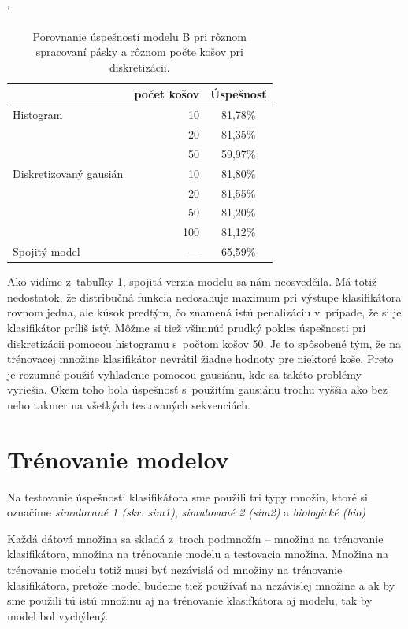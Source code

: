 \begin{table}[h]
\catcode`
\centering
\begin{tabular}{lrc}
\toprule
& počet košov & Úspešnosť\\
\midrule
Histogram & 10 & 81,78\%\\
 & 20 & 81,35\%\\
 & 50 & 59,97\%\\
Diskretizovaný gausián & 10 & 81,80\%\\
 & 20 & 81,55\%\\
 & 50 & 81,20\%\\
 & 100 & 81,12\%\\
Spojitý model & --- & 65,59\%\\
\bottomrule
\end{tabular}
\vspace{0.5cm}
\caption[Porovnanie úspešností pri rôznom spracovaní pásky]{Porovnanie úspešností modelu B pri rôznom spracovaní pásky a rôznom počte košov pri diskretizácii.}
\label{tab:success-b-tape}
\end{table}

Ako vidíme z~tabuľky \ref{tab:success-b-tape}, spojitá verzia modelu sa nám neosvedčila. Má totiž nedostatok, že distribučná funkcia nedosahuje maximum pri výstupe klasifikátora rovnom jedna, ale kúsok predtým, čo znamená istú penalizáciu v~prípade, že si je klasifikátor príliš istý.
Môžme si tiež všimnúť prudký pokles úspešnosti pri diskretizácii pomocou histogramu s~počtom košov 50. Je to spôsobené tým, že na trénovacej množine klasifikátor nevrátil žiadne hodnoty pre niektoré koše. Preto je rozumné použiť vyhladenie pomocou gausiánu, kde sa takéto problémy vyriešia. Okem toho bola úspešnosť s~použitím gausiánu trochu vyššia ako bez neho takmer na všetkých testovaných sekvenciách.

\section{Trénovanie modelov}
\label{sec:model-training}

Na testovanie úspešnosti klasifikátora sme použili tri typy množín, ktoré si označíme \textit{simulované 1 (skr. sim1)}, \textit{simulované 2 (sim2)} a \textit{biologické (bio)}

Každá dátová množina sa skladá z~troch podmnožín -- množina na trénovanie klasifikátora, množina na trénovanie modelu a testovacia množina.
Množina na trénovanie modelu totiž musí byť nezávislá od množiny na trénovanie klasifikátora, pretože model budeme tiež používať na nezávislej množine a ak by sme použili tú istú množinu aj na trénovanie klasifkátora aj modelu, tak by model bol vychýlený.

